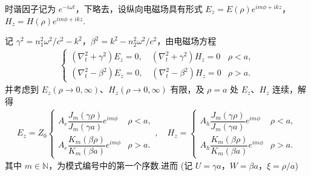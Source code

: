 时谐因子记为 \( e^{-i\omega t} \)，下略去，设纵向电磁场具有形式
\( E_z = E (\rho) e^{im\phi + ikz} \)，\( H_z = H (\rho) e^{im\phi + ikz} \).

记 \( \gamma^2 = n_1^2 \omega^2/c^2 - k^2 \)，\( \beta^2 = k^2 - n_2^2 \omega^2/c^2 \)，由电磁场方程
\begin{align*}
	\begin{cases}
		\left( \nabla_t^2 + \gamma^2 \right) E_z = 0, \quad \left( \nabla_t^2 + \gamma^2 \right) H_z = 0 & \rho < a, \\
		\left( \nabla_t^2 - \beta^2 \right) E_z = 0, \quad \left( \nabla_t^2 - \beta^2 \right) H_z = 0   & \rho > a.
	\end{cases}
\end{align*}
并考虑到 \( E_z (\rho \to 0, \infty) \)、\( H_z (\rho \to 0, \infty) \) 有限，及 \( \rho = a \) 处 \( E_z \)、\( H_z \) 连续，解得
\begin{align*}
	E_z = Z_0
	\begin{cases}
		A_e \dfrac{J_m(\gamma \rho)}{J_m(\gamma a)} e^{im\phi} & \rho < a, \\[8pt]
		A_e \dfrac{K_m(\beta \rho)}{K_m(\beta a)} e^{im\phi}   & \rho > a.
	\end{cases},\quad
	H_z =
	\begin{cases}
		A_h \dfrac{J_m(\gamma \rho)}{J_m(\gamma a)} e^{im\phi} & \rho < a, \\[8pt]
		A_h \dfrac{K_m(\beta \rho)}{K_m(\beta a)} e^{im\phi}   & \rho > a.
	\end{cases}
\end{align*}
其中 \( m \in \mathbb{N} \)，为模式编号中的第一个序数.进而 (记 \( U = \gamma a \)，\( W = \beta a \)，\( \xi = \rho/a \))
